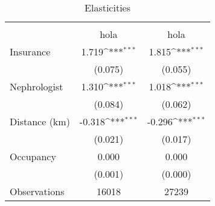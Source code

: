 \begin{table}[htbp]\centering
\def\sym#1{\ifmmode^{#1}\else\(^{#1}\)\fi}
\caption{Elasticities}
\begin{tabular}{l*{2}{c}}
\toprule
                    &\multicolumn{1}{c}{} &\multicolumn{1}{c}{} \\
                    &        hola         &        hola         \\
\midrule
Insurance           &       1.719\sym{***}&       1.815\sym{***}\\
                    &     (0.075)         &     (0.055)         \\
Nephrologist        &       1.310\sym{***}&       1.018\sym{***}\\
                    &     (0.084)         &     (0.062)         \\
Distance (km)       &      -0.318\sym{***}&      -0.296\sym{***}\\
                    &     (0.021)         &     (0.017)         \\
Occupancy           &       0.000         &       0.000         \\
                    &     (0.001)         &     (0.000)         \\
\midrule
Observations        &       16018         &       27239         \\
\bottomrule
\end{tabular}
\end{table}
